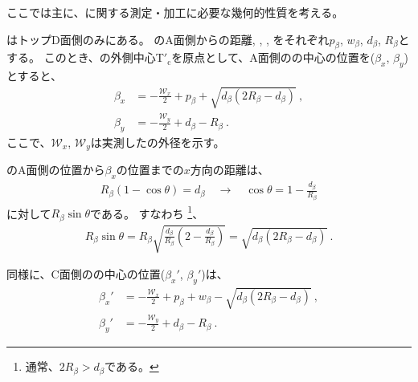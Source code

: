 

ここでは主に、\textbf{\EndFaceBoring}に関する測定・加工に必要な幾何的性質を考える。



\EndFaceBoring はトップD面側のみにある。
\EndFaceBoring のA面側からの距離, \EndFaceBoringWidth, \EndFaceBoringDepth, \EndFaceBoringCornerR をそれぞれ$p_\beta$, $w_\beta$, $d_\beta$, $R_\beta$とする。
このとき、\TopEndFace の外側中心T$'_\mathrm c$を原点として、A面側の\EndFaceBoringCornerR の中心の位置を($\beta_x$, $\beta_y$)とすると、
\begin{align*}
  \beta_x &= -\frac{\mathcal W_x}2+p_\beta+\sqrt{d_\beta(2R_\beta-d_\beta)}\ ,\\
  \beta_y &= -\frac{\mathcal W_y}2+d_\beta-R_\beta\ .
\end{align*}
ここで、$\mathcal W_x$, $\mathcal W_y$は実測した\TopEndFace の外径を示す。
\begin{hosoku}
\EndFaceBoring のA面側の位置から$\beta_x$の位置までの$x$方向の距離は、
\begin{align*}
  R_\beta(1-\cos\theta) = d_\beta\quad
  \longrightarrow\quad
  \cos\theta = 1-\frac{d_\beta}{R_\beta}
\end{align*}
に対して$R_\beta\sin\theta$である。
すなわち
\footnote{通常、$2R_\beta > d_\beta$である。}、
\begin{align*}
  R_\beta\sin\theta
  = R_\beta\sqrt{\frac{d_\beta}{R_\beta}\left(2-\frac{d_\beta}{R_\beta}\right)}
  = \sqrt{d_\beta(2R_\beta-d_\beta)}\ .
\end{align*}
\end{hosoku}
同様に、C面側の\EndFaceBoringCornerR の中心の位置($\beta_x'$, $\beta_y'$)は、
\begin{align*}
  \beta_x' &= -\frac{\mathcal W_x}2+p_\beta+w_\beta-\sqrt{d_\beta(2R_\beta-d_\beta)}\ ,\\
  \beta_y' &= -\frac{\mathcal W_y}2+d_\beta-R_\beta\ .
\end{align*}



